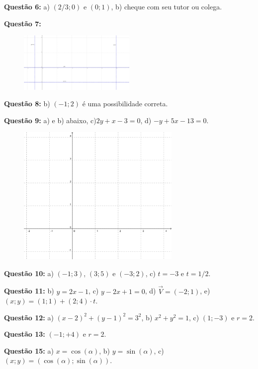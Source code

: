 \documentclass[main_estudante.tex]{subfiles}
\begin{document}
\noindent\textbf{Questão 6:} a) $(2/3;0)$ e $(0;1)$, b) cheque com seu tutor ou colega.

\noindent\textbf{Questão 7:} 

\begin{figure}[h]
\centering
\includegraphics[width=0.5\textwidth]{./img/c6g7.png}
\end{figure}

\noindent\textbf{Questão 8:} b) $(-1;2)$ é uma possibilidade correta.

\noindent\textbf{Questão 9:} a) e b) abaixo, c)$2y+x-3=0$, d) $-y+5x-13=0$.

\begin{figure}[h]
\centering
\includegraphics[width=0.7\textwidth]{./img/c6q9.png}
\end{figure}

\noindent\textbf{Questão 10:} a) $(-1;3)$, $(3;5)$ e $(-3;2)$, c) $t=-3$ e $t=1/2$.

\noindent\textbf{Questão 11:} b) $y=2x-1$, c) $y-2x+1=0$, d) $\overrightarrow{V}=(-2;1)$, e) $(x;y)=(1;1)+(2;4) \cdot t$.

\noindent\textbf{Questão 12:} a) $(x-2)^2+(y-1)^2=3^2$, b) $x^2+y^2=1$, c) $(1;-3)$ e $r=2$.

\noindent\textbf{Questão 13:} $(-1;+4)$ e $r=2$.

\noindent\textbf{Questão 15:} a) $x=\cos(\alpha)$, b) $y=\sin(\alpha)$,  c) $(x;y)=(\cos(\alpha);\sin(\alpha))$.
\end{document}

